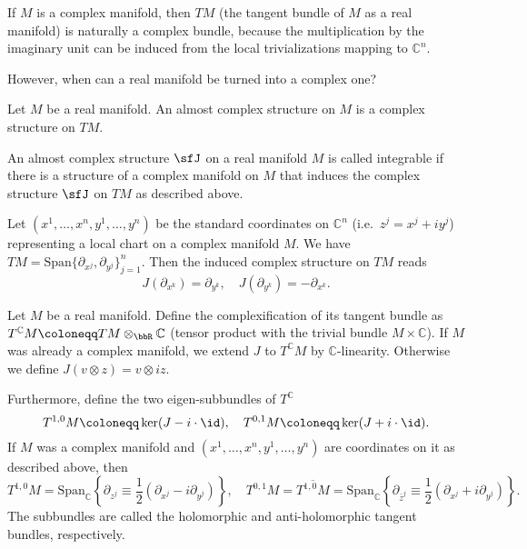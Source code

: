 If $M$ is a complex manifold, then $TM$ (the tangent bundle of $M$ as a real manifold) is naturally a complex bundle, because the multiplication by the imaginary unit can be induced from the local trivializations mapping to $\mathbb{C}^n$.

However, when can a real manifold be turned into a complex one?

\begin{defn}
    Let $M$ be a real manifold. An almost complex structure on $M$ is a complex structure on $TM$.
\end{defn}

\begin{defn}
    An almost complex structure $\sfJ$ on a real manifold $M$ is called integrable if there is a structure of a complex manifold on $M$ that induces the complex structure $\sfJ$ on $TM$ as described above.
\end{defn}

Let $(x^1,\ldots,x^n,y^1,\ldots,y^n)$ be the standard coordinates on $\mathbb{C}^n$ (i.e.\ $z^j=x^j+iy^j$) representing a local chart on a complex manifold $M$. We have $TM=\mathrm{Span}\{\partial_{x^j},\partial_{y^j}\}_{j=1}^n$. Then the induced complex structure on $TM$ reads 
\[J(\partial_{x^k})=\partial_{y^k},\quad J(\partial_{y^k})=-\partial_{x^k}.\]

\begin{defn}
    Let $M$ be a real manifold. Define the complexification of its tangent bundle as $T^\mathbb{C} M\coloneqq TM\otimes_\bbR \mathbb{C}$ (tensor product with the trivial bundle $M\times \mathbb{C}$). If $M$ was already a complex manifold, we extend $J$ to $T^\mathbb{C} M$ by $\mathbb{C}$-linearity. Otherwise we define $J(v\otimes z)=v\otimes iz$.
    
    Furthermore, define the two eigen-subbundles of $T^\mathbb{C}$
    \[T^{1,0}M\coloneqq \ker(J-i\cdot \id),\quad T^{0,1}M\coloneqq\ker(J+i\cdot\id).\]
    If $M$ was a complex manifold and $(x^1,\ldots,x^n,y^1,\ldots,y^n)$ are coordinates on it as described above, then 
    \[T^{1,0}M=\mathrm{Span}_\mathbb{C}\left\{\partial_{z^j}\equiv \frac12(\partial_{x^j}-i\partial_{y^j})\right\},\quad T^{0,1}M=\overline{T^{1,0}M}=\mathrm{Span}_\mathbb{C}\left\{\partial_{\bar z^j}\equiv \frac12(\partial_{x^j}+i\partial_{y^j})\right\}.\]
    The subbundles are called the holomorphic and anti-holomorphic tangent bundles, respectively.
\end{defn}

